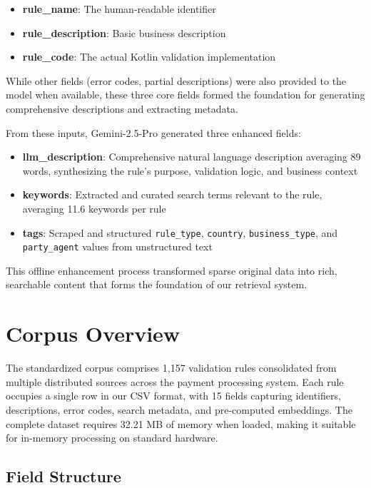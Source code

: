 \begin{itemize}[leftmargin=*,itemsep=2pt,topsep=2pt]
 \item \textbf{rule\_name}: The human-readable identifier
 \item \textbf{rule\_description}: Basic business description
 \item \textbf{rule\_code}: The actual Kotlin validation implementation
\end{itemize}

While other fields (error codes, partial descriptions) were also provided to the model when available, these three core fields formed the foundation for generating comprehensive descriptions and extracting metadata.

From these inputs, Gemini-2.5-Pro generated three enhanced fields:

\begin{itemize}[leftmargin=*,itemsep=2pt,topsep=2pt]
 \item \textbf{llm\_description}: Comprehensive natural language description averaging 89 words, synthesizing the rule's purpose, validation logic, and business context
 \item \textbf{keywords}: Extracted and curated search terms relevant to the rule, averaging 11.6 keywords per rule
 \item \textbf{tags}: Scraped and structured \texttt{rule\_type}, \texttt{country}, \texttt{business\_type}, and \texttt{party\_agent} values from unstructured text
\end{itemize}

This offline enhancement process transformed sparse original data into rich, searchable content that forms the foundation of our retrieval system.

\section{Corpus Overview}
The standardized corpus comprises 1,157 validation rules consolidated from multiple distributed sources across the payment processing system. Each rule occupies a single row in our CSV format, with 15 fields capturing identifiers, descriptions, error codes, search metadata, and pre-computed embeddings. The complete dataset requires 32.21 MB of memory when loaded, making it suitable for in-memory processing on standard hardware.

\subsection{Field Structure}

